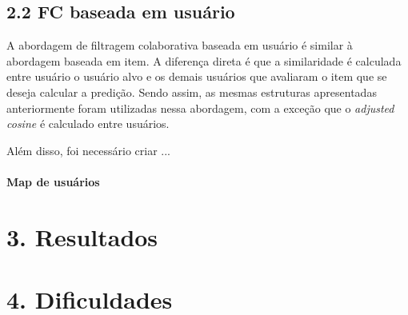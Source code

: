 \documentclass[brazil,a4paper,11pt]{article}
\begin{document}
\subsection{2.2 FC baseada em usuário}

A abordagem de filtragem colaborativa baseada em usuário é similar à abordagem baseada em item. A diferença direta é que a similaridade é calculada entre usuário o usuário alvo e os demais usuários que avaliaram o item que se deseja calcular a predição. Sendo assim, as mesmas estruturas apresentadas anteriormente foram utilizadas nessa abordagem, com a exceção que o \textit{adjusted cosine} é calculado entre usuários. 

Além disso, foi necessário criar ...

\paragraph{Map de usuários}

\section{3. Resultados}

\section{4. Dificuldades}







\end{document}

